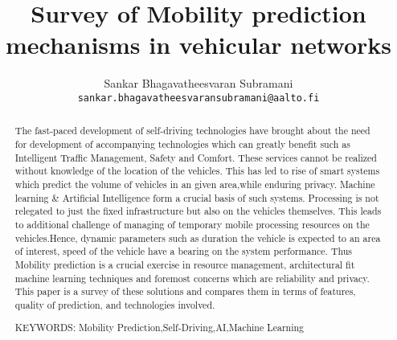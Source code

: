 \documentclass[article]{aaltoseries}
\begin{document}
 

\title{Survey of Mobility prediction mechanisms in vehicular networks}

\author{Sankar Bhagavatheesvaran Subramani%
\\\textnormal{\texttt{sankar.bhagavatheesvaransubramani@aalto.fi}}} %


\maketitle


\begin{abstract}
The fast-paced development of self-driving technologies have brought about the need for development of accompanying technologies which can greatly benefit such as Intelligent Traffic Management, Safety and Comfort. \newline
These services cannot be realized without knowledge of the location of the vehicles. \newline
This has led to rise of smart systems which predict the volume of vehicles in an given area,while enduring privacy. Machine learning & Artificial Intelligence form a crucial basis of such systems.\newline
Processing is not relegated to just the fixed infrastructure but also on the vehicles themselves. This leads to additional challenge of managing of temporary mobile processing resources on the vehicles.Hence, dynamic parameters such as duration the vehicle is expected to an area of interest, speed of the vehicle have a bearing on the system performance.\newline
  Thus Mobility prediction is a crucial exercise in resource management, architectural fit machine learning techniques and foremost concerns which are reliability and privacy. 
 This paper is a survey of these solutions and compares them in terms of features, quality of prediction, and technologies involved.

  

\vspace{3mm}
\noindent KEYWORDS:
Mobility Prediction,Self-Driving,AI,Machine Learning
\end{abstract}
\end{document}
